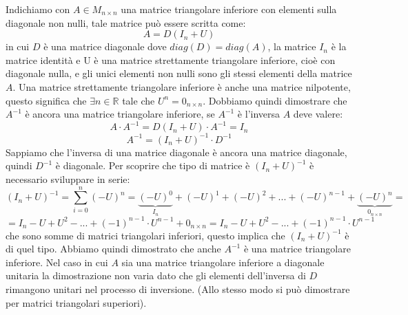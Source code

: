 \begin{flushleft}
Indichiamo con $A \in M_{n \times n}$ una matrice triangolare inferiore con elementi sulla diagonale non nulli, tale matrice può essere scritta come:
\[
A = D(I_n+U)
\]
in cui $D$ è una matrice diagonale dove $diag(D)=diag(A)$, la matrice $I_n$ è la matrice identità e U è una matrice strettamente triangolare inferiore, cioè con diagonale nulla, e gli unici elementi non nulli sono gli stessi elementi della matrice $A$. Una matrice strettamente triangolare inferiore è anche una matrice nilpotente, questo significa che $\exists n \in \mathbb{R}$ tale che $U^n = 0_{n \times n}$. Dobbiamo quindi dimostrare che $A^{-1}$ è ancora una matrice triangolare inferiore, se $A^{-1}$ è l'inversa $A$ deve valere:
\[
A\cdot A^{-1} = D(I_n+U) \cdot A^{-1} = I_n
\]
\[
A^{-1} = (I_n+U)^{-1} \cdot D^{-1}
\]
Sappiamo che l'inversa di una matrice diagonale è ancora una matrice diagonale, quindi $D^{-1}$ è diagonale. Per scoprire che tipo di matrice è $(I_n+U)^{-1}$ è necessario sviluppare in serie:
\[
(I_n+U)^{-1}= \sum_{i=0}^{n} (-U)^{n} = \underbrace{(-U)^0}_{I_n} + (-U)^1 + (-U)^2 + ... + (-U)^{n-1} + \underbrace{(-U)^{n}}_{0_{n \times n}} =
\]
\[
= I_n-U+U^2-...+(-1)^{n-1}\cdot U^{n-1}+0_{n \times n}= I_n-U+U^2-...+(-1)^{n-1}\cdot U^{n-1}
\]
che sono somme di matrici triangolari inferiori, questo implica che $(I_n+U)^{-1}$ è di quel tipo. Abbiamo quindi dimostrato che anche $A^{-1}$ è una matrice triangolare inferiore. Nel caso in cui $A$ sia una matrice triangolare inferiore a diagonale unitaria la dimostrazione non varia dato che gli elementi dell'inversa di $D$ rimangono unitari nel processo di inversione. 
(Allo stesso modo si può dimostrare per matrici triangolari superiori).
\end{flushleft}